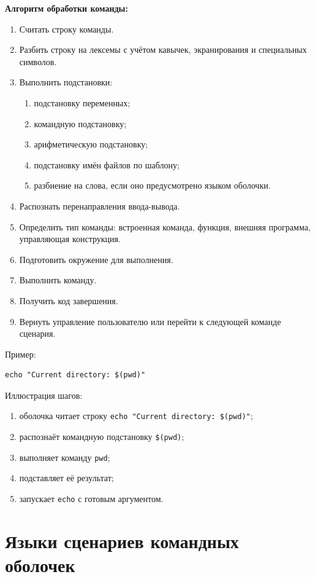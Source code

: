 \documentclass[12pt,a4paper]{article}
\begin{document}
\textbf{Алгоритм обработки команды:}
\begin{enumerate}
    \item Считать строку команды.
    \item Разбить строку на лексемы с учётом кавычек, экранирования и специальных символов.
    \item Выполнить подстановки:
    \begin{enumerate}
        \item подстановку переменных;
        \item командную подстановку;
        \item арифметическую подстановку;
        \item подстановку имён файлов по шаблону;
        \item разбиение на слова, если оно предусмотрено языком оболочки.
    \end{enumerate}
    \item Распознать перенаправления ввода-вывода.
    \item Определить тип команды: встроенная команда, функция, внешняя программа, управляющая конструкция.
    \item Подготовить окружение для выполнения.
    \item Выполнить команду.
    \item Получить код завершения.
    \item Вернуть управление пользователю или перейти к следующей команде сценария.
\end{enumerate}

Пример:

\begin{lstlisting}
echo "Current directory: $(pwd)"
\end{lstlisting}

Иллюстрация шагов:
\begin{enumerate}
    \item оболочка читает строку \texttt{echo "Current directory: \$(pwd)"};
    \item распознаёт командную подстановку \texttt{\$(pwd)};
    \item выполняет команду \texttt{pwd};
    \item подставляет её результат;
    \item запускает \texttt{echo} с готовым аргументом.
\end{enumerate}

\section{Языки сценариев командных оболочек}
\end{document}
